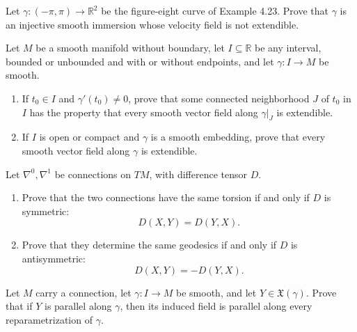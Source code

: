 \begin{exercise}
\label{prob:figure-eight-immersion}
Let $\gamma\colon(-\pi,\pi)\to\mathbb R^2$ be the figure-eight curve of
Example 4.23. Prove that $\gamma$ is an injective smooth immersion whose velocity
field is not extendible.
\end{exercise}

\begin{exercise}
\label{prob:vector-field-extendibility}
Let $M$ be a smooth manifold without boundary, let $I\subseteq\mathbb R$ be any
interval, bounded or unbounded and with or without endpoints, and let
$\gamma\colon I\to M$ be smooth.
\begin{enumerate}
\item[(a)] If $t_0\in I$ and $\gamma'(t_0)\ne0$, prove that some connected
neighborhood $J$ of $t_0$ in $I$ has the property that every smooth vector field
along $\gamma|_J$ is extendible.
\item[(b)] If $I$ is open or compact and $\gamma$ is a smooth embedding, prove
that every smooth vector field along $\gamma$ is extendible.
\end{enumerate}
\end{exercise}

\begin{exercise}
\label{prob:connections-difference-tensor}
Let $\nabla^0,\nabla^1$ be connections on $TM$, with difference tensor $D$.
\begin{enumerate}
\item[(a)] Prove that the two connections have the same torsion if and only if
$D$ is symmetric:
\[
D(X,Y)=D(Y,X).
\]
\item[(b)] Prove that they determine the same geodesics if and only if $D$ is
antisymmetric:
\[
D(X,Y)=-D(Y,X).
\]
\end{enumerate}
\end{exercise}

\begin{exercise}
\label{prob:parallel-reparametrization}
Let $M$ carry a connection, let $\gamma\colon I\to M$ be smooth, and let
$Y\in\mathfrak X(\gamma)$. Prove that if $Y$ is parallel along $\gamma$, then its
induced field is parallel along every reparametrization of $\gamma$.
\end{exercise}

